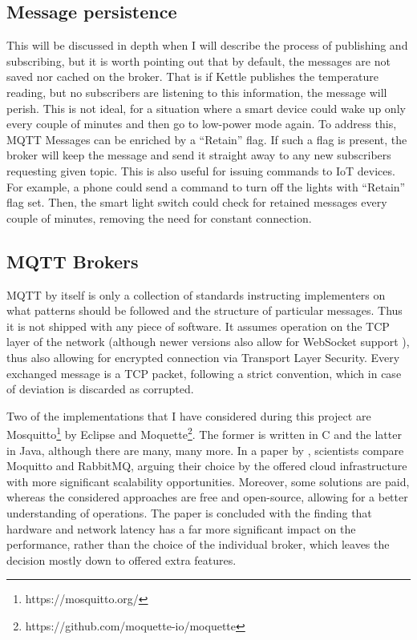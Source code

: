 \subsection{Message persistence}
This will be discussed in depth when I will describe the process of publishing and subscribing, but it is worth pointing out that by default, the messages are not saved nor cached on the broker. That is if Kettle publishes the temperature reading, but no subscribers are listening to this information, the message will perish. This is not ideal, for a situation where a smart device could wake up only every couple of minutes and then go to low-power mode again. To address this, MQTT Messages can be enriched by a ``Retain'' flag. If such a flag is present, the broker will keep the message and send it straight away to any new subscribers requesting given topic. This is also useful for issuing commands to IoT devices. For example, a phone could send a command to turn off the lights with ``Retain'' flag set. Then, the smart light switch could check for retained messages every couple of minutes, removing the need for constant connection.

\subsection{MQTT Brokers}
MQTT by itself is only a collection of standards instructing implementers on what patterns should be followed and the structure of particular messages. Thus it is not shipped with any piece of software. It assumes operation on the TCP layer of the network (although newer versions also allow for WebSocket support \citep{mijovic2016comparing}), thus also allowing for encrypted connection via Transport Layer Security. Every exchanged message is a TCP packet, following a strict convention, which in case of deviation is discarded as corrupted.

Two of the implementations that I have considered during this project are Mosquitto\footnote{https://mosquitto.org/} by Eclipse and Moquette\footnote{https://github.com/moquette-io/moquette}. The former is written in C and the latter in Java, although there are many, many more. In a paper by \citet{de2019performance}, scientists compare Moquitto and RabbitMQ, arguing their choice by the offered cloud infrastructure with more significant scalability opportunities. Moreover, some solutions are paid, whereas the considered approaches are free and open-source, allowing for a better understanding of operations. The paper is concluded with the finding that hardware and network latency has a far more significant impact on the performance, rather than the choice of the individual broker, which leaves the decision mostly down to offered extra features.

